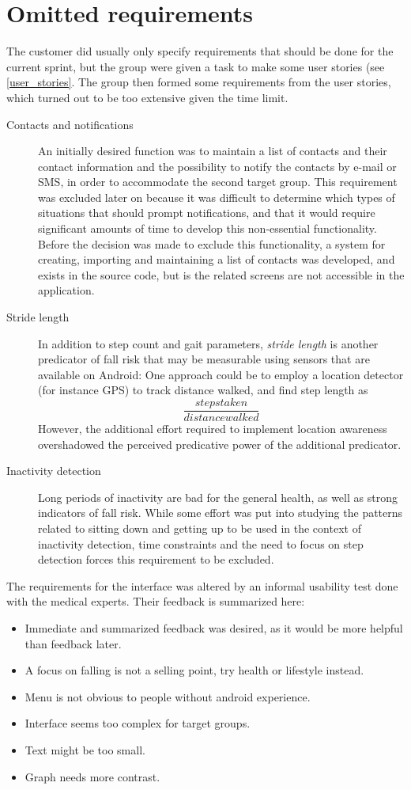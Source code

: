 \section{Omitted requirements} \label{expert_meeting_requirement}
The customer did usually only specify requirements that should be done for the current sprint, but the group were given a task to make some user stories (see \ref{user_stories}. The group then formed some requirements from the user stories, which turned out to be too extensive given the time limit.

\begin{description} 
\item[Contacts and notifications] An initially desired function was to maintain a list of contacts and their contact information and the possibility to notify the contacts by e-mail or SMS, in order to accommodate the second target group. This requirement was excluded later on because it was difficult to determine which types of situations that should prompt notifications, and that it would require significant amounts of time to develop this non-essential functionality. Before the decision was made to exclude this functionality, a system for creating, importing and maintaining a list of contacts was developed, and exists in the source code, but is the related screens are not accessible in the application.
\item[Stride length] In addition to step count and gait parameters, \emph{stride length} is another predicator of fall risk that may be measurable using sensors that are available on Android: One approach could be to employ a location detector (for instance GPS) to track distance walked, and find step length as $$\frac{steps taken}{distance walked}$$However, the additional effort required to implement location awareness overshadowed the perceived predicative power of the additional predicator.
\item[Inactivity detection] Long periods of inactivity are bad for the general health, as well as strong indicators of fall risk. While some effort was put into studying the patterns related to sitting down and getting up to be used in the context of inactivity detection, time constraints and the need to focus on step detection forces this requirement to be excluded. 
\end{description} 

The requirements for the interface was altered by an informal usability test done with the medical experts. Their feedback is summarized here: 
\begin{itemize}
\item Immediate and summarized feedback was desired, as it would be more helpful than feedback later.
\item A focus on falling is not a selling point, try health or lifestyle instead.
\item Menu is not obvious to people without android experience.
\item Interface seems too complex for target groups.
\item Text might be too small.
\item Graph needs more contrast. 

\end{itemize}
